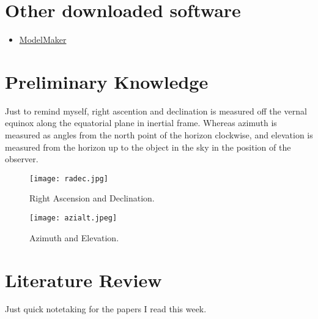 \documentclass[../main.tex]{subfiles}
\begin{document}
\section{Other downloaded software}
\begin{itemize}
    \item \href{https://10micron.eu/en/downloads/modelcreator}{ModelMaker}
\end{itemize}
\section{Preliminary Knowledge}
Just to remind myself, right ascention and declination is measured off the vernal equinox along the equatorial plane in inertial frame. Whereas azimuth is measured as angles from the north point of the horizon clockwise, and elevation is measured from the horizon up to the object in the sky in the position of the observer.

\begin{figure}[h]
    \centering
        \begin{minipage}{0.45\textwidth}
        \centering
        \texttt{[image: radec.jpg]}
        \caption{Right Ascension and Declination.}
        \label{fig:radec}
    \end{minipage}
    \hfill
    \begin{minipage}{0.45\textwidth}
        \centering
        \texttt{[image: azialt.jpeg]}
        \caption{Azimuth and Elevation.}
        \label{fig:azialt}
    \end{minipage}
\end{figure}
\section{Literature Review}
Just quick notetaking for the papers I read this week.
\end{document}
